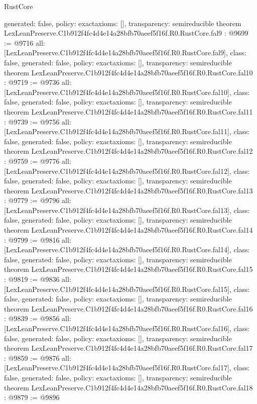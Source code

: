 \begin{lexlean}{RustCore}
\begin{coremodule}
{  generated: false,
  policy: exact{axioms: []},
  transparency: semireducible
}
theorem LexLeanPreserve.C1b912f4fc4d4e14a28bfb70aeef5f16f.R0.RustCore.fal9 : @9699 := @9716 {
  all: [LexLeanPreserve.C1b912f4fc4d4e14a28bfb70aeef5f16f.R0.RustCore.fal9],
  class: false,
  generated: false,
  policy: exact{axioms: []},
  transparency: semireducible
}
theorem LexLeanPreserve.C1b912f4fc4d4e14a28bfb70aeef5f16f.R0.RustCore.fal10 : @9719 := @9736 {
  all: [LexLeanPreserve.C1b912f4fc4d4e14a28bfb70aeef5f16f.R0.RustCore.fal10],
  class: false,
  generated: false,
  policy: exact{axioms: []},
  transparency: semireducible
}
theorem LexLeanPreserve.C1b912f4fc4d4e14a28bfb70aeef5f16f.R0.RustCore.fal11 : @9739 := @9756 {
  all: [LexLeanPreserve.C1b912f4fc4d4e14a28bfb70aeef5f16f.R0.RustCore.fal11],
  class: false,
  generated: false,
  policy: exact{axioms: []},
  transparency: semireducible
}
theorem LexLeanPreserve.C1b912f4fc4d4e14a28bfb70aeef5f16f.R0.RustCore.fal12 : @9759 := @9776 {
  all: [LexLeanPreserve.C1b912f4fc4d4e14a28bfb70aeef5f16f.R0.RustCore.fal12],
  class: false,
  generated: false,
  policy: exact{axioms: []},
  transparency: semireducible
}
theorem LexLeanPreserve.C1b912f4fc4d4e14a28bfb70aeef5f16f.R0.RustCore.fal13 : @9779 := @9796 {
  all: [LexLeanPreserve.C1b912f4fc4d4e14a28bfb70aeef5f16f.R0.RustCore.fal13],
  class: false,
  generated: false,
  policy: exact{axioms: []},
  transparency: semireducible
}
theorem LexLeanPreserve.C1b912f4fc4d4e14a28bfb70aeef5f16f.R0.RustCore.fal14 : @9799 := @9816 {
  all: [LexLeanPreserve.C1b912f4fc4d4e14a28bfb70aeef5f16f.R0.RustCore.fal14],
  class: false,
  generated: false,
  policy: exact{axioms: []},
  transparency: semireducible
}
theorem LexLeanPreserve.C1b912f4fc4d4e14a28bfb70aeef5f16f.R0.RustCore.fal15 : @9819 := @9836 {
  all: [LexLeanPreserve.C1b912f4fc4d4e14a28bfb70aeef5f16f.R0.RustCore.fal15],
  class: false,
  generated: false,
  policy: exact{axioms: []},
  transparency: semireducible
}
theorem LexLeanPreserve.C1b912f4fc4d4e14a28bfb70aeef5f16f.R0.RustCore.fal16 : @9839 := @9856 {
  all: [LexLeanPreserve.C1b912f4fc4d4e14a28bfb70aeef5f16f.R0.RustCore.fal16],
  class: false,
  generated: false,
  policy: exact{axioms: []},
  transparency: semireducible
}
theorem LexLeanPreserve.C1b912f4fc4d4e14a28bfb70aeef5f16f.R0.RustCore.fal17 : @9859 := @9876 {
  all: [LexLeanPreserve.C1b912f4fc4d4e14a28bfb70aeef5f16f.R0.RustCore.fal17],
  class: false,
  generated: false,
  policy: exact{axioms: []},
  transparency: semireducible
}
theorem LexLeanPreserve.C1b912f4fc4d4e14a28bfb70aeef5f16f.R0.RustCore.fal18 : @9879 := @9896 {
}
\end{coremodule}
\end{lexlean}
